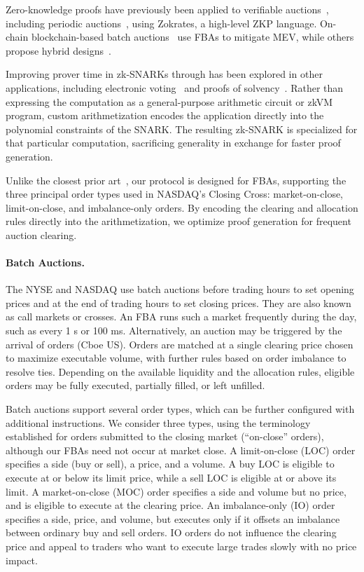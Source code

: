 Zero-knowledge proofs have previously been applied to verifiable auctions~\cite{PRST06}, including periodic auctions~\cite{GY21}, using Zokrates, a high-level ZKP language. On-chain blockchain-based batch auctions~\cite{MDFO22,MoCl23} use FBAs to mitigate MEV, while others propose hybrid designs~\cite{CC22}.

Improving prover time in zk-SNARKs through \textit{\ari} has been explored in other applications, including electronic voting~\cite{MEC26} and proofs of solvency~\cite{DC26}. Rather than expressing the computation as a general-purpose arithmetic circuit or zkVM program, custom arithmetization encodes the application directly into the polynomial constraints of the SNARK. The resulting zk-SNARK is specialized for that particular computation, sacrificing generality in exchange for faster proof generation.

Unlike the closest prior art~\cite{GY21}, our protocol is designed for FBAs, supporting the three principal order types used in NASDAQ's Closing Cross: market-on-close, limit-on-close, and imbalance-only orders. By encoding the clearing and allocation rules directly into the arithmetization, we optimize proof generation for frequent auction clearing.

\paragraph{Batch Auctions.} The NYSE and NASDAQ use batch auctions before trading hours to set opening prices and at the end of trading hours to set closing prices. They are also known as call markets or crosses. An FBA runs such a market frequently during the day, such as every 1 s or 100 ms. Alternatively, an auction may be triggered by the arrival of orders (\eg Cboe US). Orders are matched at a single clearing price chosen to maximize executable volume, with further rules based on order imbalance to resolve ties. Depending on the available liquidity and the allocation rules, eligible orders may be fully executed, partially filled, or left unfilled.

Batch auctions support several order types, which can be further configured with additional instructions. We consider three types, using the terminology established for orders submitted to the closing market (``on-close'' orders), although our FBAs need not occur at market close. A limit-on-close (LOC) order specifies a side (buy or sell), a price, and a volume. A buy LOC is eligible to execute at or below its limit price, while a sell LOC is eligible at or above its limit. A market-on-close (MOC) order specifies a side and volume but no price, and is eligible to execute at the clearing price. An imbalance-only (IO) order specifies a side, price, and volume, but executes only if it offsets an imbalance between ordinary buy and sell orders. IO orders do not influence the clearing price and appeal to traders who want to execute large trades slowly with no price impact. %

